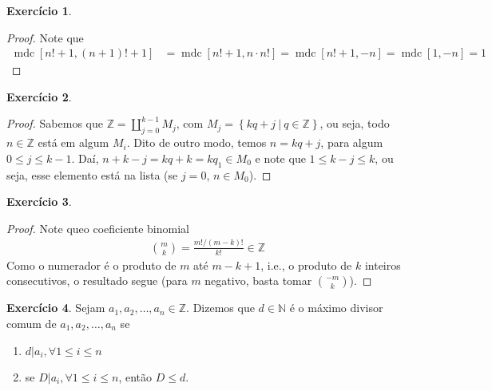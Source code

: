\documentclass[a4paper,12pt]{article}
\DeclareMathOperator{\mdc}{mdc}
\theoremstyle{definition}
\newtheorem{exercise}{Exercício}%
\begin{document}
	\begin{exercise}
		\begin{proof}
			Note que
			\begin{align*}
			\mdc[n! + 1, (n+1)! + 1] &= \mdc[n! + 1, n\cdot n!] = \mdc[n! + 1, -n] = \mdc[1, -n] = 1 
			\end{align*}
		\end{proof}
	\end{exercise}
	\begin{exercise}
		\begin{proof}
			Sabemos que $\displaystyle{\mathbb{Z} = \coprod_{j=0}^{k-1} M_j}$, com $M_j = \left\{ kq + j \ | \ q\in\mathbb{Z}  \right\}$, ou seja, todo $n\in\mathbb{Z}$ está em algum $M_i$. Dito de outro modo, temos $n = kq + j$, para algum $0\leq j\leq k-1$. Daí, $n + k - j = kq + k = kq_1\in M_0$ e note que $1\leq k-j\leq k$, ou seja, esse elemento está na lista (se $j=0$, $n\in M_0$). 
		\end{proof}
	\end{exercise}
	\begin{exercise}
		\begin{proof}
			Note queo coeficiente binomial
			\begin{align*}
			\binom{m}{k} = \frac{m!/(m-k)!}{k!}\in\mathbb{Z}
			\end{align*}
			Como o numerador é o produto de $m$ até $m-k+1$, i.e., o produto de $k$ inteiros consecutivos, o resultado segue (para $m$ negativo, basta tomar $\displaystyle{\binom{-m}{k}}$).
		\end{proof}
	\end{exercise}
	\begin{exercise}
		Sejam $a_1, a_2, \dots, a_n\in\mathbb{Z}$. Dizemos que $d\in\mathbb{N}$ é o máximo divisor comum de $a_1, a_2, \dots, a_n$ se
		\begin{enumerate}
			\item $d|a_i, \forall 1\leq i\leq n$ 
			\item se $D|a_i, \forall 1\leq i\leq n$, então $D\leq d$.
		\end{enumerate}
	\end{exercise}
\end{document}
